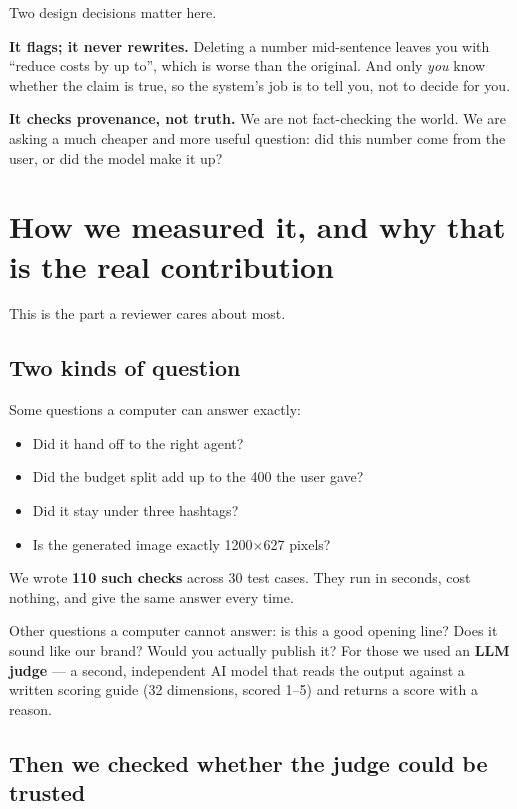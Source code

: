 \documentclass[11pt]{article}
\begin{document}
Two design decisions matter here.

\textbf{It flags; it never rewrites.} Deleting a number mid-sentence leaves you
with ``reduce costs by up to'', which is worse than the original. And only
\emph{you} know whether the claim is true, so the system's job is to tell you,
not to decide for you.

\textbf{It checks provenance, not truth.} We are not fact-checking the world. We
are asking a much cheaper and more useful question: did this number come from
the user, or did the model make it up?

\section{How we measured it, and why that is the real contribution}

This is the part a reviewer cares about most.

\subsection{Two kinds of question}

Some questions a computer can answer exactly:

\begin{itemize}
\item Did it hand off to the right agent?
\item Did the budget split add up to the 400 the user gave?
\item Did it stay under three hashtags?
\item Is the generated image exactly 1200$\times$627 pixels?
\end{itemize}

We wrote \textbf{110 such checks} across 30 test cases. They run in seconds,
cost nothing, and give the same answer every time.

Other questions a computer cannot answer: is this a good opening line? Does it
sound like our brand? Would you actually publish it? For those we used an
\textbf{LLM judge} --- a second, independent AI model that reads the output
against a written scoring guide (32 dimensions, scored 1--5) and returns a score
with a reason.

\subsection{Then we checked whether the judge could be trusted}
\end{document}
